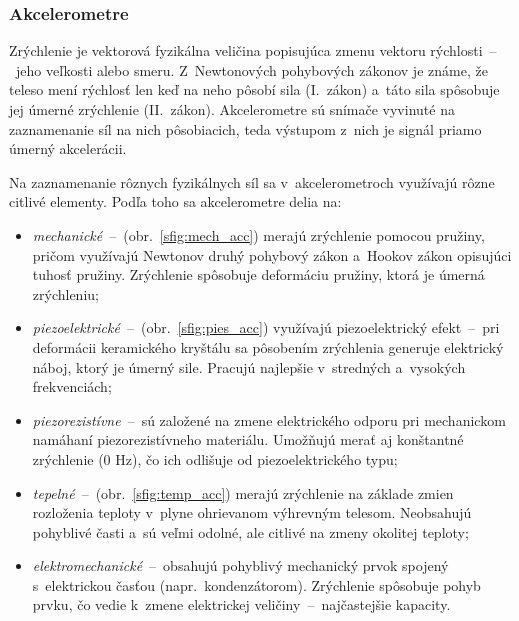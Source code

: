     \subsubsection{Akcelerometre}

      Zrýchlenie je vektorová fyzikálna veličina popisujúca zmenu vektoru rýchlosti~--~jeho veľkosti alebo smeru. Z~Newtonových pohybových zákonov je známe, že teleso mení rýchlosť len keď na neho pôsobí sila (I.\ zákon) a~táto sila spôsobuje jej úmerné zrýchlenie (II.\ zákon). Akcelerometre sú snímače vyvinuté na zaznamenanie síl na nich pôsobiacich, teda výstupom z~nich je signál priamo úmerný akcelerácii.
    
      Na zaznamenanie rôznych fyzikálnych síl sa v~akcelerometroch využívajú rôzne citlivé elementy. Podľa toho sa akcelerometre delia na\cite{duchonSnimaceMobilnejRobotike2012}:
      \begin{itemize}
        \item \emph{mechanické}~--~(obr.~\ref{sfig:mech_acc}) merajú zrýchlenie pomocou pružiny, pričom využívajú Newtonov druhý pohybový zákon a~Hookov zákon opisujúci tuhosť pružiny. Zrýchlenie spôsobuje deformáciu pružiny, ktorá je úmerná zrýchleniu;
        \item \emph{piezoelektrické}~--~(obr.~\ref{sfig:pies_acc}) využívajú piezoelektrický efekt~--~pri deformácii keramického kryštálu sa pôsobením zrýchlenia generuje elektrický náboj, ktorý je úmerný sile. Pracujú najlepšie v~stredných a~vysokých frekvenciách;
        \item \emph{piezorezistívne}~--~sú založené na zmene elektrického odporu pri mechanickom namáhaní piezorezistívneho materiálu. Umožňujú merať aj konštantné zrýchlenie (0 Hz), čo ich odlišuje od piezoelektrického typu;
        \item \emph{tepelné}~--~(obr.~\ref{sfig:temp_acc}) merajú zrýchlenie na základe zmien rozloženia teploty v~plyne ohrievanom výhrevným telesom. Neobsahujú pohyblivé časti a~sú veľmi odolné, ale citlivé na zmeny okolitej teploty;
        \item \emph{elektromechanické}~--~obsahujú pohyblivý mechanický prvok spojený s~elektrickou časťou (napr.\ kondenzátorom). Zrýchlenie spôsobuje pohyb prvku, čo vedie k~zmene elektrickej veličiny~--~najčastejšie kapacity.
      \end{itemize}

